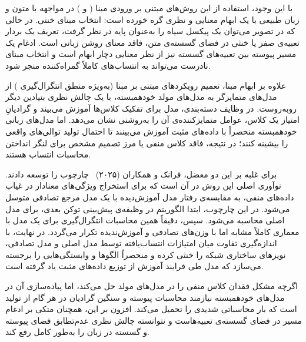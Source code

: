 با این وجود، استفاده از این روش‌های مبتنی بر ورودی مبنا ( و ) در مواجهه با متون و زبان طبیعی با یک ابهام معنایی و نظری گره خورده است: انتخاب مبنای خنثی. در حالی که در تصویر می‌توان یک پیکسل سیاه را به‌عنوان پایه در نظر گرفت، تعریف یک بردار تعبیه‌ی صفر یا خنثی در فضای گسسته‌ی متن، فاقد معنای روشن زبانی است. ادغام یک مسیر پیوسته بین تعبیه‌های گسسته نیز از نظر معنایی دچار ابهام است و انتخاب مبنای نادرست می‌تواند به انتساب‌های کاملاً گمراه‌کننده منجر شود.

علاوه بر ابهام مبنا، تعمیم رویکردهای مبتنی بر مبنا (به‌ویژه منطق انتگرال‌گیری ) از مدل‌های متمایزگر به مدل‌های مولد خودهمبسته، با یک چالش نظری بنیادین دیگر روبه‌روست. در وظایف دسته‌بندی، مدل برای تفکیک کلاس‌ها آموزش می‌بیند و گرادیانِ امتیاز یک کلاس، عوامل متمایزکننده‌ی آن را به‌روشنی نشان می‌دهد. اما مدل‌های زبانی خودهمبسته منحصراً با داده‌های مثبت آموزش می‌بینند تا احتمال تولید توالی‌های واقعی را بیشینه کنند؛ در نتیجه، فاقد کلاس منفی یا مرز تصمیم مشخص برای لنگر انداختن محاسبات انتساب هستند. 

برای غلبه بر این دو معضل، فرانک و همکاران (۲۰۲۵)~\cite{frank2025attribution} چارچوب  را توسعه دادند. نوآوری اصلی این روش در آن است که برای استخراج ویژگی‌های معنادار در غیاب داده‌های منفی، به مقایسه‌ی رفتار مدل آموزش‌دیده با یک مدل مرجع تصادفی متوسل می‌شود. در این چارچوب، ابتدا الگوریتم  در وظیفه‌ی پیش‌بینی توکن بعدی، برای مدل اصلی محاسبه می‌شود. سپس، دقیقاً همین محاسبات انتگرال‌گیری برای یک مدل با معماری کاملاً مشابه اما با وزن‌های تصادفی و آموزش‌ندیده تکرار می‌گردد. در نهایت،  با اندازه‌گیری تفاوت میان امتیازات انتساب‌یافته توسط مدل اصلی و مدل تصادفی، نویزهای ساختاری شبکه را خنثی کرده و منحصراً الگوها و وابستگی‌هایی را برجسته می‌سازد که مدل طی فرایند آموزش از توزیع داده‌های مثبت یاد گرفته است.

اگرچه  مشکل فقدان کلاس منفی را در مدل‌های مولد حل می‌کند، اما پیاده‌سازی آن در مدل‌های خودهمبسته نیازمند محاسبات پیوسته و سنگین گرادیان در هر گام از تولید است که بار محاسباتی شدیدی را تحمیل می‌کند. افزون بر این،  همچنان متکی بر ادغام مسیر در فضای گسسته‌ی تعبیه‌هاست و نتوانسته چالش نظری عدم‌تطابق فضای پیوسته و گسسته در زبان را به‌طور کامل رفع کند.

